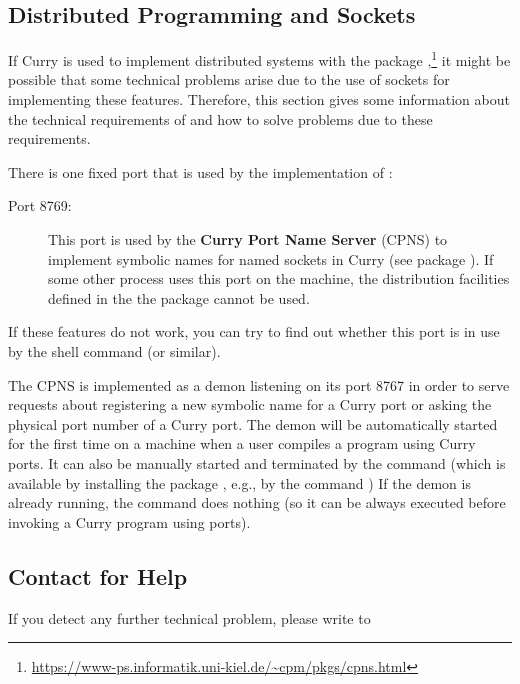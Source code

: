 \subsection{Distributed Programming and Sockets}

If Curry is used to implement distributed systems
with the package ,\footnote{%
\url{https://www-ps.informatik.uni-kiel.de/~cpm/pkgs/cpns.html}}
it might be possible that some technical problems
arise due to the use of sockets for implementing these
features. Therefore, this section gives some information
about the technical requirements of \CYS and how to solve
problems due to these requirements.

There is one fixed port that is used by the implementation of \CYS:
\begin{description}
\item[Port 8769:] This port is used by the
{\bf Curry Port Name Server} (CPNS) to implement symbolic names for
named sockets in Curry (see package ).
If some other process uses this port on the machine,
the distribution facilities defined in the the package 
cannot be used.
\end{description}
If these features do not work, you can try to find out
whether this port is in use by the shell command
 (or similar).

The CPNS is implemented as a demon listening on its port 8767
in order to serve requests about registering a new symbolic
name for a Curry port or asking the physical port number
of a Curry port. The demon will be automatically started for
the first time on a machine when a user compiles a program
using Curry ports.
It can also be manually started and terminated by the
command  (which is available by installing
the package , e.g., by the command )
If the demon is already running,
the command 
does nothing (so it can be always executed
before invoking a Curry program using ports).

\subsection{Contact for Help}

If you detect any further technical problem,
please write to
\begin{center}
\end{center}

